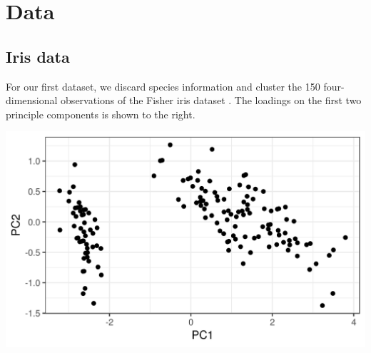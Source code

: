 \documentclass[a0,plainsections,30pt]{sciposter}\usepackage[]{graphicx}\usepackage[]{color}
\newenvironment{knitrout}{}{} %
\begin{document}
\begin{minipage}[t]{0.45\textwidth}
%   
%   

\end{minipage}
\hfill \vrule \hfill
\begin{minipage}[t]{0.45\textwidth}




\section*{Data}
\vspace{-0.3in}
%
\begin{minipage}[t]{0.49\textwidth}
%
\subsection*{Iris data}
For our first dataset, we discard species
information and cluster the 150 four-dimensional observations of the Fisher iris
dataset \citep{iris_data_anderson}.
The loadings on the first two principle components is shown
to the right.
%
\end{minipage}
%
\begin{minipage}[t]{0.49\textwidth}


\begin{knitrout}
\color{fgcolor}

{\centering \includegraphics[width=0.98\linewidth,height=0.588\linewidth]{figure/iris_pca-1} 

}
\end{knitrout}
\end{minipage}
\end{minipage}
\end{document}
